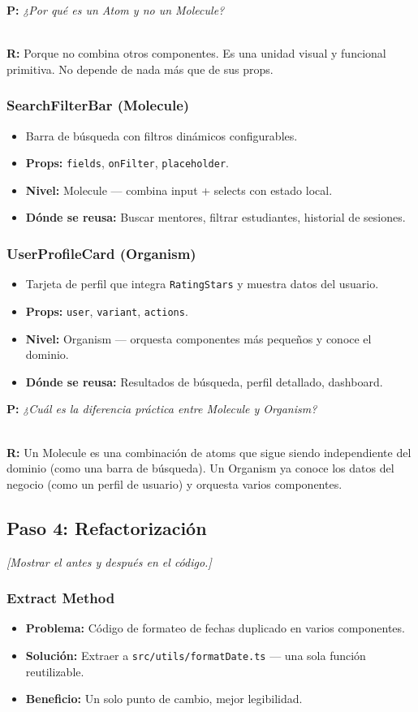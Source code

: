 \documentclass[12pt, a4paper]{article}
\newcommand{\nota}[1]{%
  \textcolor{upds-gold}{\small\textit{[#1]}}%
}
\newcommand{\pregunta}[1]{%
  \textbf{\textcolor{upds-blue}{P:}} \textit{#1}%
}
\newcommand{\respuesta}[1]{%
  \\[2pt]\textbf{\textcolor{upds-blue}{R:}} #1%
}
\begin{document}
\pregunta{¿Por qué es un Atom y no un Molecule?}
\respuesta{Porque no combina otros componentes. Es una unidad visual y funcional primitiva. No depende de nada más que de sus props.}

\subsubsection{SearchFilterBar (Molecule)}
\begin{itemize}
  \item Barra de búsqueda con filtros dinámicos configurables.
  \item \textbf{Props:} \texttt{fields}, \texttt{onFilter}, \texttt{placeholder}.
  \item \textbf{Nivel:} Molecule --- combina input + selects con estado local.
  \item \textbf{Dónde se reusa:} Buscar mentores, filtrar estudiantes, historial de sesiones.
\end{itemize}

\subsubsection{UserProfileCard (Organism)}
\begin{itemize}
  \item Tarjeta de perfil que integra \texttt{RatingStars} y muestra datos del usuario.
  \item \textbf{Props:} \texttt{user}, \texttt{variant}, \texttt{actions}.
  \item \textbf{Nivel:} Organism --- orquesta componentes más pequeños y conoce el dominio.
  \item \textbf{Dónde se reusa:} Resultados de búsqueda, perfil detallado, dashboard.
\end{itemize}

\pregunta{¿Cuál es la diferencia práctica entre Molecule y Organism?}
\respuesta{Un Molecule es una combinación de atoms que sigue siendo independiente del dominio (como una barra de búsqueda). Un Organism ya conoce los datos del negocio (como un perfil de usuario) y orquesta varios componentes.}

\subsection{Paso 4: Refactorización}
\nota{Mostrar el antes y después en el código.}

\subsubsection{Extract Method}
\begin{itemize}
  \item \textbf{Problema:} Código de formateo de fechas duplicado en varios componentes.
  \item \textbf{Solución:} Extraer a \texttt{src/utils/formatDate.ts} --- una sola función reutilizable.
  \item \textbf{Beneficio:} Un solo punto de cambio, mejor legibilidad.
\end{itemize}
\end{document}
